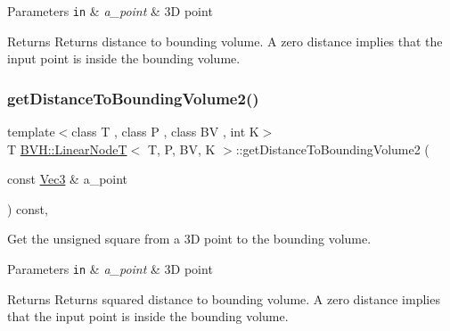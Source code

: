\begin{DoxyParams}[1]{Parameters}
\mbox{\tt in}  & {\em a\+\_\+point} & 3D point \\
\hline
\end{DoxyParams}
\begin{DoxyReturn}{Returns}
Returns distance to bounding volume. A zero distance implies that the input point is inside the bounding volume. 
\end{DoxyReturn}
\mbox{\label{classBVH_1_1LinearNodeT_a3e85605a1f0986b8440964ed0dbe90f6}} 
\subsubsection{\texorpdfstring{get\+Distance\+To\+Bounding\+Volume2()}{getDistanceToBoundingVolume2()}}
{\footnotesize\ttfamily template$<$class T , class P , class BV , int K$>$ \\
T \hyperlink{classBVH_1_1LinearNodeT}{B\+V\+H\+::\+Linear\+NodeT}$<$ T, P, BV, K $>$\+::get\+Distance\+To\+Bounding\+Volume2 (\begin{DoxyParamCaption}\item[{const \hyperlink{classBVH_1_1LinearNodeT_a073e87d51d44b4cc243c8f90690247a6}{Vec3} \&}]{a\+\_\+point }\end{DoxyParamCaption}) const\hspace{0.3cm}{\ttfamily [inline]}, {\ttfamily [noexcept]}}



Get the unsigned square from a 3D point to the bounding volume. 


\begin{DoxyParams}[1]{Parameters}
\mbox{\tt in}  & {\em a\+\_\+point} & 3D point \\
\hline
\end{DoxyParams}
\begin{DoxyReturn}{Returns}
Returns squared distance to bounding volume. A zero distance implies that the input point is inside the bounding volume. 
\end{DoxyReturn}
\mbox{\label{classBVH_1_1LinearNodeT_a1a0a50ba8c1c0601f12ae02857246b1f}} 

